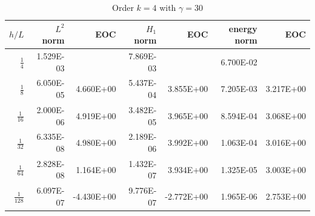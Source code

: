 \begin{table}
  \caption{\label{tab:ex2_order4} Order $k=4$ with $ \gamma = 30$}
  \begin{tabular}{rrrrrrr}
    \hline\hline
    \textbf{$h/{L} $} & \textbf{$L^2$ norm} & \textbf{EOC} & \textbf{$H_1$ norm} & \textbf{EOC} & \textbf{energy norm} & \textbf{EOC} \\\hline
    $\frac{1}{4}$ & 1.529E-03 &  & 7.869E-03 &  & 6.700E-02 &  \\
    $\frac{1}{8}$ & 6.050E-05 & 4.660E+00 & 5.437E-04 & 3.855E+00 & 7.205E-03 & 3.217E+00 \\
    $\frac{1}{16}$ & 2.000E-06 & 4.919E+00 & 3.482E-05 & 3.965E+00 & 8.594E-04 & 3.068E+00 \\
    $\frac{1}{32}$ & 6.335E-08 & 4.980E+00 & 2.189E-06 & 3.992E+00 & 1.063E-04 & 3.016E+00 \\
    $\frac{1}{64}$ & 2.828E-08 & 1.164E+00 & 1.432E-07 & 3.934E+00 & 1.325E-05 & 3.003E+00 \\
    $\frac{1}{128}$ & 6.097E-07 & -4.430E+00 & 9.776E-07 & -2.772E+00 & 1.965E-06 & 2.753E+00 \\\hline\hline
  \end{tabular}
\end{table}


